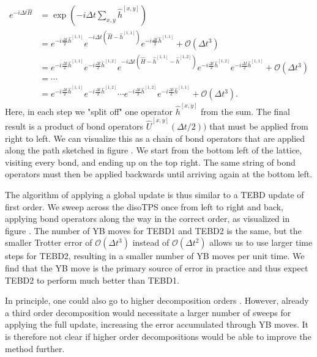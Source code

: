 \begin{equation}
	\begin{split}
		\label{eq:disoTPS_tebd_second_order_suzuki_trotter_decomposition}
		e^{-i\Delta t\hat{H}} &= \exp\left(-i\Delta t\sum_{x,y}\hat{h}^{[x,y]}\right) \\
		&= e^{-i\frac{\Delta t}{2}\hat{h}^{[1, 1]}} e^{-i\Delta t\left(\hat{H}-\hat{h}^{[1,1]}\right)} e^{-i\frac{\Delta t}{2}\hat{h}^{[1, 1]}} + \mathcal{O}(\Delta t^3)\\
		&= e^{-i\frac{\Delta t}{2}\hat{h}^{[1, 1]}} e^{-i\frac{\Delta t}{2}\hat{h}^{[1, 2]}} e^{-i\Delta t\left(\hat{H}-\hat{h}^{[1,1]}-\hat{h}^{[1, 2]}\right)} e^{-i\frac{\Delta t}{2}\hat{h}^{[1, 2]}} e^{-i\frac{\Delta t}{2}\hat{h}^{[1, 1]}} + \mathcal{O}(\Delta t^3)\\
		&=\cdots\\
		&= e^{-i\frac{\Delta t}{2}\hat{h}^{[1, 1]}} e^{-i\frac{\Delta t}{2}\hat{h}^{[1, 2]}} \cdots e^{-i\frac{\Delta t}{2}\hat{h}^{[1, 2]}} e^{-i\frac{\Delta t}{2}\hat{h}^{[1, 1]}} + \mathcal{O}(\Delta t^3).
	\end{split}
\end{equation}
Here, in each step we "split off" one operator $\hat{h}^{[x,y]}$ from the sum. The final result is a product of bond operators $\hat{U}^{[x,y]}(\Delta t/2))$ that must be applied from right to left. We can visualize this as a chain of bond operators that are applied along the path sketched in figure . We start from the bottom left of the lattice, visiting every bond, and ending up on the top right. The same string of bond operators must then be applied backwards until arriving again at the bottom left. \par
The algorithm of applying a global update is thus similar to a TEBD update of first order. We sweep across the disoTPS once from left to right and back, applying bond operators along the way in the correct order, as visualized in figure . The number of YB moves for TEBD1 and TEBD2 is the same, but the smaller Trotter error of $\mathcal{O}(\Delta t^3)$ instead of $\mathcal{O}(\Delta t^2)$ allows us to use larger time steps for TEBD2, resulting in a smaller number of YB moves per unit time. We find that the YB move is the primary source of error in practice and thus expect TEBD2 to perform much better than TEBD1. \par 
In principle, one could also go to higher decomposition orders \cite{cite:finding_exponential_product_formulas_of_higher_orders}. However, already a third order decomposition would necessitate a larger number of sweeps for applying the full update, increasing the error accumulated through YB moves. It is therefore not clear if higher order decompositions would be able to improve the method further.
